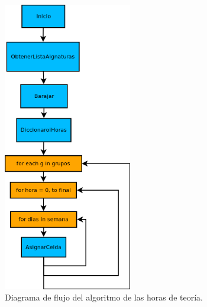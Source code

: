 \begin{figure}[H]
\centering
\includegraphics[width=0.5\textwidth]{img/d2}
\caption{Diagrama de flujo del algoritmo de las horas de teoría.}
\label{d2}
\end{figure}
